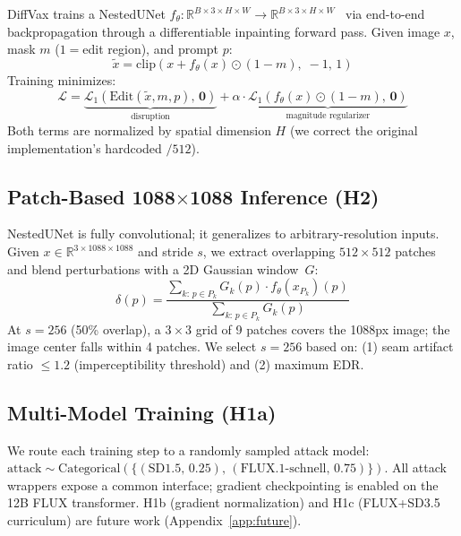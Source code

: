 \documentclass{article}
\begin{document}
DiffVax trains a NestedUNet $f_\theta: \mathbb{R}^{B\times3\times H\times W}
\!\to\! \mathbb{R}^{B\times3\times H\times W}$~\citep{zhou2018unetpp} via
end-to-end backpropagation through a differentiable inpainting forward pass.
Given image $x$, mask $m$ ($1=$edit region), and prompt $p$:
\begin{equation}
\tilde{x} = \mathrm{clip}(x + f_\theta(x)\odot(1-m),\;-1,\,1)
\end{equation}
Training minimizes:
\begin{equation}
\mathcal{L} = \underbrace{\mathcal{L}_1\!\left(\mathrm{Edit}(\tilde{x},m,p),\,\mathbf{0}\right)}_{\text{disruption}} + \alpha\cdot\underbrace{\mathcal{L}_1\!\left(f_\theta(x)\odot(1-m),\,\mathbf{0}\right)}_{\text{magnitude regularizer}}
\label{eq:loss}
\end{equation}
Both terms are normalized by spatial dimension $H$ (we correct the original
implementation's hardcoded $/512$).

\subsection{Patch-Based 1088$\times$1088 Inference (H2)}

NestedUNet is fully convolutional; it generalizes to arbitrary-resolution inputs.
Given $x\in\mathbb{R}^{3\times1088\times1088}$ and stride $s$, we extract overlapping
$512\!\times\!512$ patches and blend perturbations with a 2D Gaussian window~$G$:
\begin{equation}
\delta(p) = \frac{\sum_{k:\,p\in P_k} G_k(p)\cdot f_\theta(x_{P_k})(p)}{\sum_{k:\,p\in P_k} G_k(p)}
\label{eq:blend}
\end{equation}
At $s=256$ (50\% overlap), a $3\times3$ grid of 9 patches covers the 1088px image;
the image center falls within 4 patches. We select $s=256$ based on: (1) seam
artifact ratio $\leq1.2$ (imperceptibility threshold) and (2) maximum EDR.

\subsection{Multi-Model Training (H1a)}

We route each training step to a randomly sampled attack model:
$\text{attack}\sim\text{Categorical}(\{(\text{SD1.5},\,0.25),\,(\text{FLUX.1-schnell},\,0.75)\})$.
All attack wrappers expose a common interface; gradient checkpointing is enabled on
the 12B FLUX transformer. H1b (gradient normalization) and H1c (FLUX+SD3.5 curriculum)
are future work (Appendix~\ref{app:future}).
\end{document}
